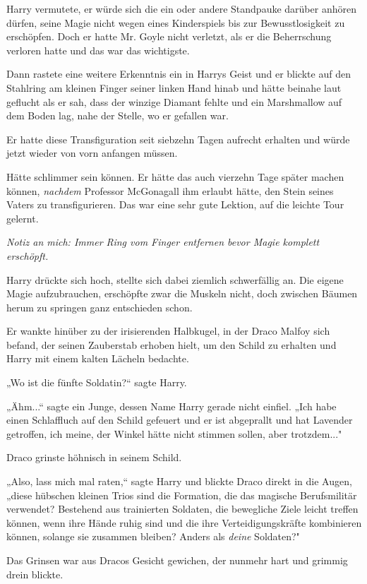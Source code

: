 {Harry vermutete, er würde sich die ein oder andere Standpauke darüber anhören dürfen, seine Magie nicht wegen eines Kinderspiels bis zur Bewusstlosigkeit zu erschöpfen. Doch er hatte Mr. Goyle nicht verletzt, als er die Beherrschung verloren hatte und das war das wichtigste.

Dann rastete eine weitere Erkenntnis ein in Harrys Geist und er blickte auf den Stahlring am kleinen Finger seiner linken Hand hinab und hätte beinahe laut geflucht als er sah, dass der winzige Diamant fehlte und ein Marshmallow auf dem Boden lag, nahe der Stelle, wo er gefallen war.

Er hatte diese Transfiguration seit siebzehn Tagen aufrecht erhalten und würde jetzt wieder von vorn anfangen müssen.

Hätte schlimmer sein können. Er hätte das auch vierzehn Tage später machen können, \emph{nachdem} Professor McGonagall ihm erlaubt hätte, den Stein seines Vaters zu transfigurieren. Das war eine sehr gute Lektion, auf die leichte Tour gelernt.

\emph{Notiz an mich: Immer Ring vom Finger entfernen bevor Magie komplett erschöpft.}

Harry drückte sich hoch, stellte sich dabei ziemlich schwerfällig an. Die eigene Magie aufzubrauchen, erschöpfte zwar die Muskeln nicht, doch zwischen Bäumen herum zu springen ganz entschieden schon.

Er wankte hinüber zu der irisierenden Halbkugel, in der Draco Malfoy sich befand, der seinen Zauberstab erhoben hielt, um den Schild zu erhalten und Harry mit einem kalten Lächeln bedachte.

„Wo ist die fünfte Soldatin?“ sagte Harry.

„Ähm...“ sagte ein Junge, dessen Name Harry gerade nicht einfiel. „Ich habe einen Schlaffluch auf den Schild gefeuert und er ist abgeprallt und hat Lavender getroffen, ich meine, der Winkel hätte nicht stimmen sollen, aber trotzdem..."

Draco grinste höhnisch in seinem Schild.

„Also, lass mich mal raten,“ sagte Harry und blickte Draco direkt in die Augen, „diese hübschen kleinen Trios sind die Formation, die das magische Berufsmilitär verwendet? Bestehend aus trainierten Soldaten, die bewegliche Ziele leicht treffen können, wenn ihre Hände ruhig sind und die ihre Verteidigungskräfte kombinieren können, solange sie zusammen bleiben? Anders als \emph{deine} Soldaten?"

Das Grinsen war aus Dracos Gesicht gewichen, der nunmehr hart und grimmig drein blickte.

}
